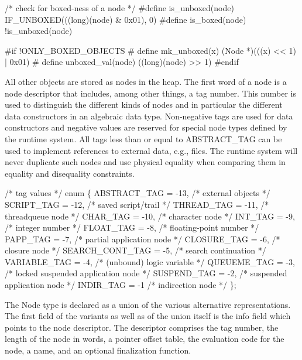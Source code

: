 /* check for boxed-ness of a node */
#define is_unboxed(node)        IF_UNBOXED(((long)(node) & 0x01), 0)
#define is_boxed(node)          !is_unboxed(node)

#if !ONLY_BOXED_OBJECTS
# define mk_unboxed(x)          (Node *)(((x) << 1) | 0x01)
# define unboxed_val(node)      ((long)(node) >> 1)
#endif

\nwendcode{}\nwdocspar
All other objects are stored as nodes in the heap. The first word of a
node is a node descriptor that includes, among other things, a tag
number. This number is used to distinguish the different kinds of
nodes and in particular the different data constructors in an
algebraic data type. Non-negative tags are used for data constructors
and negative values are reserved for special node types defined by
the runtime system. All tags less than or equal to {\Tt{}ABSTRACT{\_}TAG\nwendquote}
can be used to implement references to external data, e.g., files. The
runtime system will never duplicate such nodes and use physical
equality when comparing them in equality and disequality constraints.

\nwenddocs{}\plusendmoddef\nwstartdeflinemarkup{}\nwenddeflinemarkup
/* tag values */
enum \{
    ABSTRACT_TAG    = -13,      /* external objects */
    SCRIPT_TAG      = -12,      /* saved script/trail */
    THREAD_TAG      = -11,      /* threadqueue node */
    CHAR_TAG        = -10,      /* character node */
    INT_TAG         = -9,       /* integer number */
    FLOAT_TAG       = -8,       /* floating-point number */
    PAPP_TAG        = -7,       /* partial application node */
    CLOSURE_TAG     = -6,       /* closure node */
    SEARCH_CONT_TAG = -5,       /* search continuation */
    VARIABLE_TAG    = -4,       /* (unbound) logic variable */
    QUEUEME_TAG     = -3,       /* locked suspended application node */
    SUSPEND_TAG     = -2,       /* suspended application node */
    INDIR_TAG       = -1        /* indirection node */
\};

\nwendcode{}\nwdocspar
The {\Tt{}Node\nwendquote} type is declared as a union of the various alternative
representations. The first field of the variants as well as of the
union itself is the {\Tt{}info\nwendquote} field which points to the node
descriptor. The descriptor comprises the tag number, the length of the
node in words, a pointer offset table, the evaluation code for the
node, a name, and an optional finalization function.

